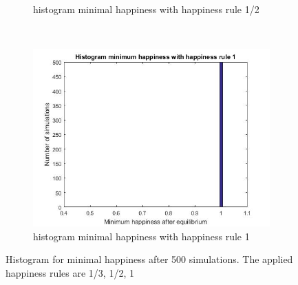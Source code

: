 \documentclass{article}
\begin{document}
\begin{figure}[ht]
\begin{subfigure}[t]{0.32\textwidth}
        \caption{histogram minimal happiness with happiness rule 1/2}
        \label{fig:tiger}
    \end{subfigure}
    ~ %
    \begin{subfigure}[t]{0.32\textwidth}
        \includegraphics[width=\textwidth]{histogram_min_happiness_een}
        \caption{histogram minimal happiness with happiness rule 1}
        \label{minimal happiness 1}
    \end{subfigure}
    \caption{Histogram for minimal happiness after 500 simulations. The applied happiness rules are 1/3, 1/2, 1 }
\end{figure}
\end{document}
